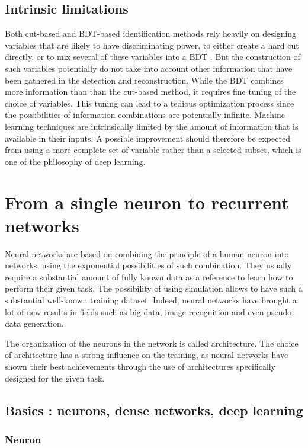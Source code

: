 \subsection{Intrinsic limitations}

Both cut-based and BDT-based identification methods rely heavily on designing variables that are likely to have discriminating power, to either create a hard cut directly, or to mix several of these variables into a BDT . But the construction of such variables potentially do not take into account other information that have been gathered in the detection and reconstruction.
While the BDT combines more information than than the cut-based method, it requires fine tuning of the choice of variables. This tuning can lead to a tedious optimization process since the possibilities of information combinations are potentially infinite. Machine learning techniques are intrinsically limited by the amount of information that is available in their inputs. 
A possible improvement should therefore be expected from using a more complete set of variable rather than a selected subset, which is one of the philosophy of deep learning.


\section{From a single neuron to recurrent networks}
\label{sec:NN}
Neural networks are based on combining the principle of a human neuron into networks, using the exponential possibilities of such combination.
They usually require a substantial amount of fully known data as a reference to learn how to perform their given task. The possibility of using simulation allows to have such a substantial  well-known training dataset.
Indeed, neural networks have brought a lot of new results in fields such as big data, image recognition and even pseudo-data generation.

The organization of the neurons in the network is called architecture. The choice of architecture has a strong influence on the training, as neural networks have shown their best achievements through the use of architectures specifically designed for the given task.

\subsection{Basics : neurons, dense networks, deep learning}

\subsubsection{Neuron}

